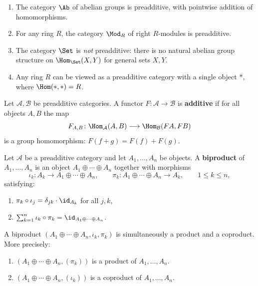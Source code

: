 \begin{example}\label{ex:preadditive-examples}
\begin{enumerate}
    \item The category $\Ab$ of abelian groups is preadditive, with pointwise addition
    of homomorphisms.
    \item For any ring $R$, the category $\Mod_R$ of right $R$-modules is preadditive.
    \item The category $\Set$ is \emph{not} preadditive: there is no natural abelian group
    structure on $\Hom_{\Set}(X,Y)$ for general sets $X, Y$.
    \item Any ring $R$ can be viewed as a preadditive category with a single object $*$,
    where $\Hom(*, *) = R$.
\end{enumerate}
\end{example}

\begin{definition}\label{def:additive-functor}
Let $\mathcal{A}, \mathcal{B}$ be preadditive categories. A functor
$F \colon \mathcal{A} \to \mathcal{B}$ is \textbf{additive} if for all objects $A, B$
the map
\[
    F_{A,B} \colon \Hom_{\mathcal{A}}(A,B) \longrightarrow \Hom_{\mathcal{B}}(FA, FB)
\]
is a group homomorphism: $F(f + g) = F(f) + F(g)$.
\end{definition}

\begin{definition}[Biproduct]\label{def:biproduct}
Let $\mathcal{A}$ be a preadditive category and let $A_1, \ldots, A_n$ be objects.
A \textbf{biproduct} of $A_1, \ldots, A_n$ is an object $A_1 \oplus \cdots \oplus A_n$
together with morphisms
\[
    \iota_k \colon A_k \to A_1 \oplus \cdots \oplus A_n, \qquad
    \pi_k \colon A_1 \oplus \cdots \oplus A_n \to A_k, \qquad 1 \leq k \leq n,
\]
satisfying:
\begin{enumerate}
    \item $\pi_k \circ \iota_j = \delta_{jk} \cdot \id_{A_k}$ for all $j, k$,
    \item $\sum_{k=1}^n \iota_k \circ \pi_k = \id_{A_1 \oplus \cdots \oplus A_n}$.
\end{enumerate}
\end{definition}

\begin{proposition}\label{prop:biproduct-universal}
A biproduct $(A_1 \oplus \cdots \oplus A_n, \iota_k, \pi_k)$ is simultaneously
a product and a coproduct. More precisely:
\begin{enumerate}
    \item $(A_1 \oplus \cdots \oplus A_n, (\pi_k))$ is a product of $A_1, \ldots, A_n$.
    \item $(A_1 \oplus \cdots \oplus A_n, (\iota_k))$ is a coproduct of $A_1, \ldots, A_n$.
\end{enumerate}
\end{proposition}

